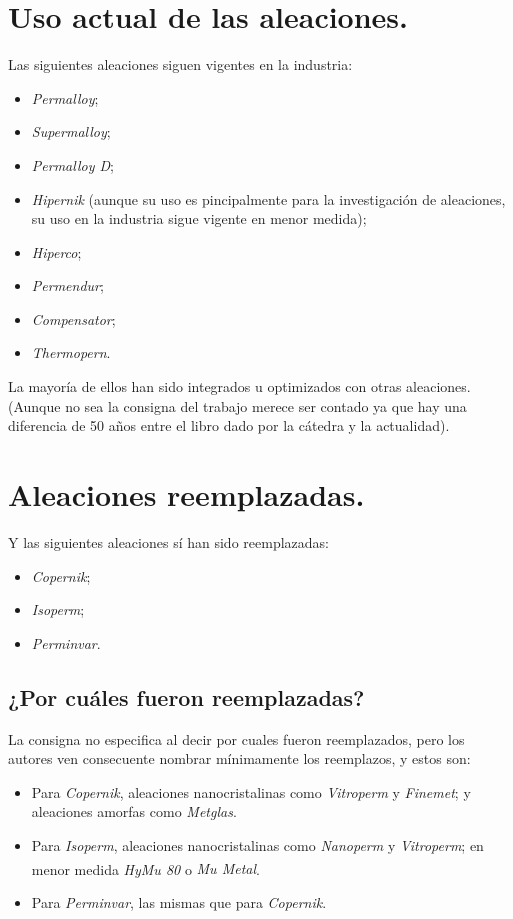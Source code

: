 \documentclass[12pt,a4paper]{article}
\begin{document}
\section{Uso actual de las aleaciones.}

Las siguientes aleaciones siguen vigentes en la industria:
\begin{itemize}
    \item \textit{Permalloy};
    \item \textit{Supermalloy};
    \item \textit{Permalloy D};
    \item \textit{Hipernik} (aunque su uso es pincipalmente para la investigación de aleaciones, su uso en la industria sigue vigente en menor medida);
    \item \textit{Hiperco};
    \item \textit{Permendur};
    \item \textit{Compensator};
    \item \textit{Thermopern}.
\end{itemize}
La mayoría de ellos han sido integrados u optimizados con otras aleaciones. (Aunque no sea la consigna del trabajo merece ser contado ya que hay una diferencia de 50 años entre el libro dado por la cátedra y la actualidad).

\section{Aleaciones reemplazadas.}

Y las siguientes aleaciones sí han sido reemplazadas:
\begin{itemize}
    \item \textit{Copernik};
    \item \textit{Isoperm};
    \item \textit{Perminvar}.
\end{itemize}

\subsection{¿Por cuáles fueron reemplazadas?}

La consigna no especifica al decir por cuales fueron reemplazados, pero los autores ven consecuente nombrar mínimamente los reemplazos, y estos son:
\begin{itemize}
    \item Para \textit{Copernik}, aleaciones nanocristalinas como \textit{Vitroperm} y \textit{Finemet}; y aleaciones amorfas como \textit{Metglas}.
    \item Para \textit{Isoperm}, aleaciones nanocristalinas como \textit{Nanoperm} y \textit{Vitroperm}; en menor medida \textit{HyMu 80} o \textit{Mu Metal\textsuperscript{\textregistered}}.
    \item Para \textit{Perminvar}, las mismas que para \textit{Copernik}.
\end{itemize}
\end{document}
